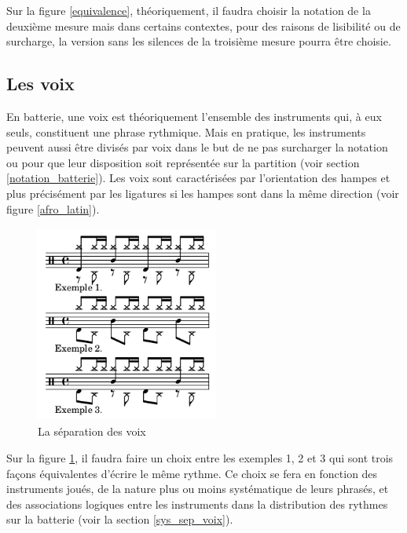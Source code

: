Sur la figure \ref{equivalence}, théoriquement, il faudra choisir la notation
de la deuxième mesure mais dans certains contextes, pour des raisons de
lisibilité ou de surcharge, la version sans les silences de la troisième mesure
pourra être choisie.

\subsection*{Les voix}


En batterie, une voix est théoriquement l’ensemble des instruments qui, à eux
seuls, constituent une phrase rythmique. Mais en pratique, les instruments
peuvent aussi être divisés par voix dans le but de ne pas surcharger la
notation ou pour que leur disposition soit représentée sur la
partition (voir section \ref{notation_batterie}).
Les voix sont caractérisées par l’orientation des hampes et plus précisément
par les ligatures si les hampes sont dans la même direction (voir figure
\ref{afro_latin}).

\begin{figure}[h]
	\centering
	\includegraphics[height=65mm, width=60mm]{
    z_images/3_methodes/0_notation_de_la_batterie/7_voix.png}
	\caption{La séparation des voix}
	\label{sep_voix}
\end{figure}
Sur la figure \ref{sep_voix}, il faudra faire un choix entre les exemples 1, 2
et 3 qui sont trois façons équivalentes d’écrire le même rythme.
Ce choix se fera en fonction des instruments joués, de la nature plus ou moins
systématique de leurs phrasés, et des associations logiques entre les
instruments dans la distribution des rythmes sur la batterie (voir la section
\ref{sys_sep_voix}).

